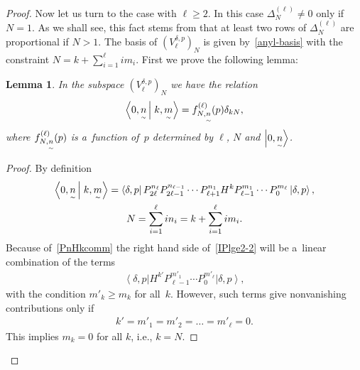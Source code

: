 \documentclass[11pt]{article}
\numberwithin{equation}{section}
\newcommand{\underaccent}[2]{\mathord{\underset{\smash{\scriptscriptstyle\sim}}{#2}}}
\newtheorem{lemma}{Lemma}
\def\bra#1{\left\langle #1\right|}
\def\ket#1{\left| #1\right\rangle}
\def\bracket#1#2{\left\langle #1  \,\right| \left. #2 \right\rangle}
\begin{document}
\begin{proof}
Now let us turn to the case with $\ell \geq 2$.
In this case $ \Delta^{(\ell)}_N \neq 0 $ only if $N = 1$.
As we shall see, this fact stems from that at least two rows of $ \Delta^{(\ell)}_N $ are proportional if $ N > 1$.
The basis of $(V^{\delta,p}_{\ell})_N $ is given by~\eqref{anyl-basis} with the constraint $  N = k+
\sum\limits_{i=1}^{\ell} i   m_i$.
First we prove the following lemma:
\begin{lemma}
\label{lemma2}
In the subspace $ (V^{\delta,p}_{\ell})_N $ we have the relation
\begin{gather*}
\bracket{0,\underaccent{\tilde}{n}}{k,\underaccent{\tilde}{m}} = f^{(\ell)}_{N,\underaccent{\tilde}{n}}(p) \delta_{kN},
\end{gather*}
where $ f^{(\ell)}_{N,\underaccent{\tilde}{n}}(p) $ is a~function of~$p$ determined by $ \ell$, $N $ and $
\ket{0,\underaccent{\tilde}{n}}$.
\end{lemma}
\begin{proof}
By def\/inition
\begin{gather}
    \bracket{0,\underaccent{\tilde}{n}}{k,\underaccent{\tilde}{m}} = \bra{\delta,p} P_{2\ell}^{n_{\ell}}
P_{2\ell-1}^{n_{\ell-1}} \cdots P_{\ell+1}^{n_1} H^k P_{\ell-1}^{m_1} \cdots P_0^{m_{\ell}} \ket{\delta,p},
\label{IPlge2-2}
\\
    N = \sum\limits_{i=1}^{\ell} i n_i = k + \sum\limits_{i=1}^{\ell} i  m_i.
\nonumber
\end{gather}
Because of~\eqref{PnHkcomm} the right hand side of~\eqref{IPlge2-2} will be a~linear combination of the terms
\begin{gather*}
\bra{\delta,p} H^{k'} P_{\ell-1}^{m'_1} \cdots P_0^{m'_{\ell}} \ket{\delta,p},
\end{gather*}
with the condition $ m'_k \geq m_k $ for all~$k$.
However, such terms give nonvanishing contributions only if
\begin{gather*}
k' = m'_1 = m'_2 = \dots = m'_{\ell} = 0.
\end{gather*}
This implies $ m_k = 0 $ for all $k$, i.e., $ k = N$.
\end{proof}


\end{proof}
\end{document}
